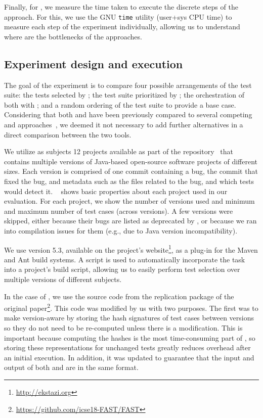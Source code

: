 Finally, for , we measure the time taken to execute the discrete steps of the approach.
For this, we use the GNU \texttt{time} utility (user+sys CPU time) to measure each step of the experiment individually, allowing us to understand where are the bottlenecks of the approaches.

\subsection{Experiment design and execution}
\label{subsec:experiment}



The goal of the experiment is to compare four possible arrangements of the test suite: 
the tests selected by \ek; the test suite prioritized by \fs; the orchestration of both with \fz; and a random ordering of the test suite to provide a base case.
Considering that both \ek and \fs have been previously compared to several competing \tcs and \tcp approaches~\cite{legunsen2016, zhang_hybrid_2018, miranda_fast_2018}, we deemed it not necessary to add further alternatives in a direct comparison between the two tools.

We utilize as subjects 12 projects available as part of the \dfj repository~\cite{just2014defects4j} that contains multiple versions of Java-based open-source software projects of different sizes.
Each version is comprised of one commit containing a bug, the commit that fixed the bug, and metadata such as the files related to the bug, and which tests would detect it.
~ shows basic properties about each project
used in our evaluation.
For each project, we show the number of versions used and minimum and maximum number of test cases (across versions).
A few versions were skipped, either because their bugs are listed as deprecated by \dfj, or because we ran into compilation issues for them (e.g., due to Java version incompatibility).

We use \ek version 5.3, available on the project's website\footnote{\url{http://ekstazi.org}}, as a plug-in for the Maven and Ant build systems.
A script is used to automatically incorporate the \ek task into a project's build script, allowing us to easily perform test selection over multiple versions of different subjects.

In the case of \fs, we use the source code from the replication package of the original paper\footnote{\url{https://github.com/icse18-FAST/FAST}}.
This code was modified by us with two purposes.
The first was to make \fs version-aware by storing the hash signatures of test cases between versions so they do not need to be re-computed unless there is a modification.
This is important because computing the hashes is the most time-consuming part of \fs, so storing these representations for unchanged tests greatly reduces overhead after an initial execution.
In addition, it was updated to guarantee that the input and output of both \ek and \fs are in the same format.

